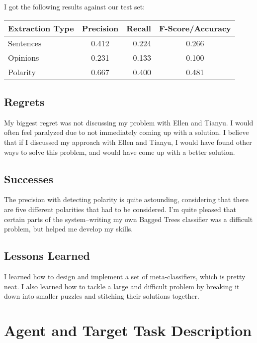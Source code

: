 \documentclass{article}
\begin{document}
    I got the following results against our test set:

    \begin{center}
        \begin{tabular}{ | l | c | r | c}
            \hline
            Extraction Type & Precision & Recall & F-Score/Accuracy \\ \hline
            Sentences & 0.412 & 0.224 & 0.266 \\ \hline
            Opinions & 0.231 & 0.133 & 0.100 \\ \hline
            Polarity & 0.667 & 0.400 & 0.481 \\ \hline
        \end{tabular}
    \end{center}

    \subsection{Regrets}

    My biggest regret was not discussing my problem with Ellen and Tianyu. I would often feel paralyzed due to not immediately coming up with a solution. I believe that if I discussed my approach with Ellen and Tianyu, I would have found other ways to solve this problem, and would have come up with a better solution.

    \subsection{Successes}

    The precision with detecting polarity is quite astounding, considering that there are five different polarities that had to be considered. I'm quite pleased that certain parts of the system--writing my own Bagged Trees classifier was a difficult problem, but helped me develop my skills.

    \subsection{Lessons Learned}

    I learned how to design and implement a set of meta-classifiers, which is pretty neat. I also learned how to tackle a large and difficult problem by breaking it down into smaller puzzles and stitching their solutions together.

    \section{Agent and Target Task Description}
\end{document}
